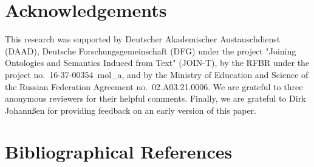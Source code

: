 \documentclass[10pt, a4paper]{article}
\begin{document}
\section{Acknowledgements}

This research was supported by Deutscher Akademischer Austauschdienst (DAAD), Deutsche For\-schungs\-gemeinschaft (DFG) under the project "Joining Ontologies and Semantics Induced from Text" (JOIN-T), by the RFBR under the project no.~16-37-00354~mol\_a, and by the Ministry of Education and Science of the Russian Federation Agreement no.~02.A03.21.0006. We are grateful to three anonymous reviewers for their helpful comments. Finally, we are grateful to Dirk Johann\ss en for providing feedback on an early version of this paper.

\section{Bibliographical References}
\label{main:ref}





\end{document}
